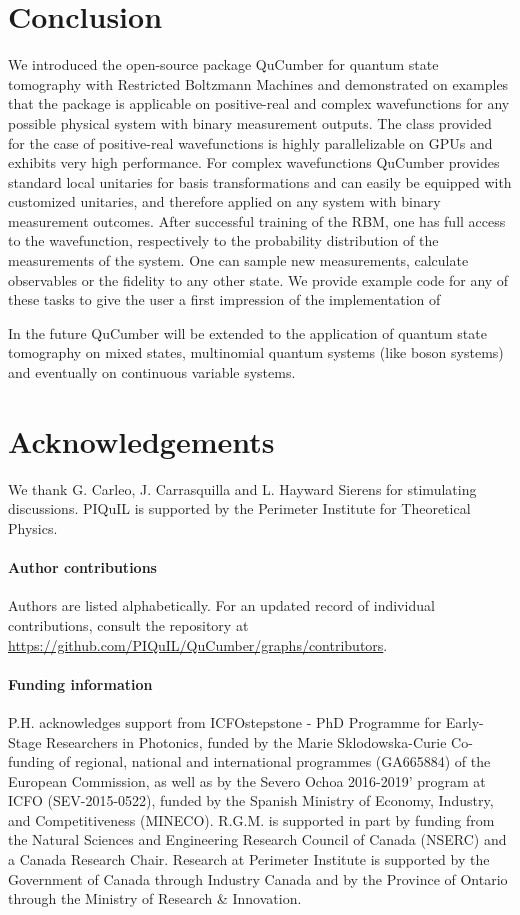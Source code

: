 \documentclass[submission, Phys]{SciPost}
\begin{document}
\section{Conclusion}

We introduced the open-source package QuCumber for quantum state tomography with Restricted Boltzmann Machines and demonstrated on examples that
the package is applicable on positive-real and complex wavefunctions for any possible physical system with binary measurement outputs.
The class provided for the case of positive-real wavefunctions is highly parallelizable on GPUs and exhibits very high performance.
For complex wavefunctions QuCumber provides standard local unitaries for basis transformations
and can easily be equipped with customized unitaries, and therefore applied on any system with binary measurement outcomes.
After successful training of the RBM, one has full access to the wavefunction, respectively to the probability distribution of the measurements of the system.
One can sample new measurements, calculate observables or the fidelity to any other state.
We provide example code for any of these tasks to give the user a first impression of the implementation of

In the future QuCumber will be extended to the application of quantum state tomography on mixed states, multinomial quantum systems (like boson systems) and eventually on continuous variable systems.

\section*{Acknowledgements}
We thank G. Carleo, J. Carrasquilla and L. Hayward Sierens for stimulating discussions.
PIQuIL is supported by the Perimeter Institute for Theoretical Physics.

\paragraph{Author contributions}
Authors are listed alphabetically. For an updated record of individual contributions, consult the repository at \url{https://github.com/PIQuIL/QuCumber/graphs/contributors}.

\paragraph{Funding information}
P.H. acknowledges support from ICFOstepstone - PhD Programme for Early-Stage Researchers in Photonics, funded by the Marie Sklodowska-Curie Co-funding of regional, national and international programmes (GA665884) of the European Commission, as well as by the Severo Ochoa 2016-2019' program at ICFO (SEV-2015-0522), funded by the Spanish Ministry of Economy, Industry, and Competitiveness (MINECO).
R.G.M. is supported in part by funding from the Natural Sciences and Engineering Research Council of Canada (NSERC) and a Canada Research Chair.
Research at Perimeter Institute is supported by the Government of Canada through Industry Canada and by the Province of Ontario through the Ministry of Research \& Innovation.
\end{document}
